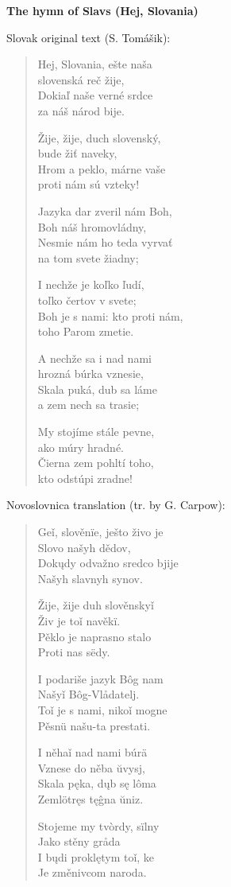 \textbf{The hymn of Slavs (Hej, Slovania)}

Slovak original text (S. Tomášik):

\begin{verse}
	Hej, Slovania, ešte naša \\
	slovenská reč žije, \\
	Dokiaľ naše verné srdce \\
	za náš národ bije.
	
	Žije, žije, duch slovenský, \\
	bude žiť naveky, \\
	Hrom a peklo, márne vaše \\
	proti nám sú vzteky!
	
	Jazyka dar zveril nám Boh, \\
	Boh náš hromovládny, \\
	Nesmie nám ho teda vyrvať \\
	na tom svete žiadny;
	
	I nechže je koľko ľudí, \\
	toľko čertov v svete; \\
	Boh je s nami: kto proti nám, \\
	toho Parom zmetie.
	
	A nechže sa i nad nami \\
	hrozná búrka vznesie, \\
	Skala puká, dub sa láme \\
	a zem nech sa trasie;
	
	My stojíme stále pevne, \\
	ako múry hradné. \\
	Čierna zem pohltí toho, \\
	kto odstúpi zradne!
\end{verse}

Novoslovnica translation (tr. by G. Carpow):

\begin{verse}
	Geǐ, slověnïe, ješto živo je \\
	Slovo našyh dědov, \\
	Dokųdy odvažno sredco bjije \\
	Našyh slavnyh synov.
	
	Žije, žije duh slověnskyǐ \\
	Živ je toǐ navěkï. \\
	Pěklo je naprasno stalo \\
	Proti nas sëdy.
	
	I podariše jazyk Bôg nam \\
	Našyǐ Bôg-Vlådatelj. \\
	Toǐ je s nami, nikoǐ mogne \\
	Pěsnü našu-ta prestati.
	
	I něhaǐ nad nami búrä \\
	Vznese do něba ŭvysj, \\
	Skala pęka, dųb sę lôma \\
	Zemlötręs tęĝna ŭniz.
	
	Stojeme my tvòrdy, sïlny \\
	Jako stěny gråda \\
	I bųdi proklętym toǐ, ke \\
	Je změnivcom naroda.
\end{verse}

